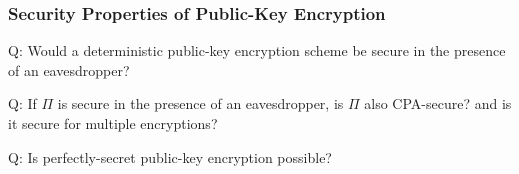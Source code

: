 \begin{frame}\frametitle{Security Properties of Public-Key Encryption}
\begin{theorem}
\alert{Q: Would a deterministic public-key encryption scheme be secure in the presence of an eavesdropper?}
\end{theorem}
\begin{proposition}
\alert{Q: If $\Pi$ is secure in the presence of an eavesdropper, is $\Pi$ also CPA-secure? and is it secure for multiple encryptions?}
\end{proposition}
\begin{proposition}
\alert{Q: Is perfectly-secret public-key encryption possible?}
\end{proposition}
\end{frame}

